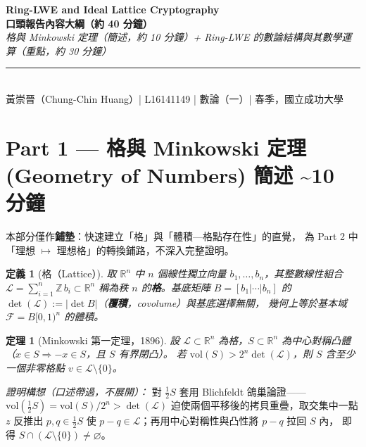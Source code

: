 \documentclass[10.5pt, a4paper]{article}
\theoremstyle{cpt}
\newtheorem{definition}{定義}
\newtheorem{theorem}{定理}
\newcommand{\timetag}[1]{\hfill\colorbox{timefill}{\small\color{gray}\textbf{#1}}}
\begin{document}
\begin{center}
  {\LARGE\bfseries\color{accent}
    Ring-LWE and Ideal Lattice Cryptography}\\[2pt]
  {\large\bfseries 口頭報告內容大綱（約 40 分鐘）}\\[1pt]
  {\small\itshape\color{accent}
    格與 Minkowski 定理（簡述，約 10 分鐘）\;+\; Ring-LWE 的數論結構與其數學運算（重點，約 30 分鐘）}\\[5pt]
  \rule{\linewidth}{0.8pt}\\[2pt]
  {\small 黃崇晉（Chung-Chin Huang）\;|\; L16141149
    \;|\; 數論（一）\;| 春季，國立成功大學}
\end{center}

\vspace{1pt}

\section{Part 1 — 格與 Minkowski 定理
  \textnormal{\small\color{gray}(Geometry of Numbers)}
  \timetag{簡述 \textasciitilde 10 分鐘}}

本部分僅作\textbf{鋪墊}：快速建立「格」與「體積—格點存在性」的直覺，
為 Part 2 中「理想 $\mapsto$ 理想格」的轉換鋪路，不深入完整證明。

\begin{definition}[格（Lattice）]
  取 $\mathbb{R}^n$ 中 $n$ 個線性獨立向量 $b_1,\ldots,b_n$，其整數線性組合
  $\mathcal{L}=\sum_{i=1}^n\mathbb{Z}\,b_i\subset\mathbb{R}^n$
  稱為秩 $n$ 的\textbf{格}。基底矩陣 $B=[b_1|\cdots|b_n]$ 的
  $\det(\mathcal{L}):=|\det B|$（\textbf{覆積}，covolume）與基底選擇無關，
  幾何上等於基本域 $\mathcal{F}=B[0,1)^n$ 的體積。
\end{definition}

\begin{theorem}[Minkowski 第一定理，1896]
  設 $\mathcal{L}\subset\mathbb{R}^n$ 為格，$S\subset\mathbb{R}^n$ 為中心對稱凸體
  （$x\in S\Rightarrow -x\in S$，且 $S$ 有界閉凸）。
  若 $\mathrm{vol}(S) > 2^n\det(\mathcal{L})$，則 $S$ 含至少一個非零格點 $v\in\mathcal{L}\setminus\{0\}$。
\end{theorem}

\textit{證明構想（口述帶過，不展開）：} 對 $\tfrac12 S$ 套用 Blichfeldt
鴿巢論證——$\mathrm{vol}(\tfrac12 S) = \mathrm{vol}(S)/2^n > \det(\mathcal{L})$
迫使兩個平移後的拷貝重疊，取交集中一點 $z$ 反推出 $p,q\in\tfrac12 S$ 使
$p-q\in\mathcal{L}$；再用中心對稱性與凸性將 $p-q$ 拉回 $S$ 內，
即得 $S\cap(\mathcal{L}\setminus\{0\})\neq\varnothing$。
\end{document}
